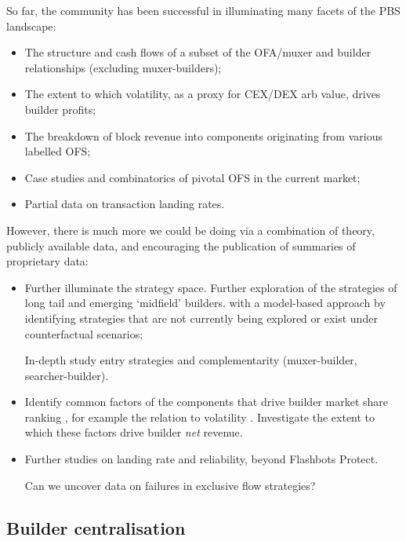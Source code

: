 So far, the community has been successful in illuminating many facets of the PBS landscape:
%
\begin{itemize}
  \item The structure and cash flows of a subset of the OFA/muxer and builder relationships (excluding muxer-builders);
  \item The extent to which volatility, as a proxy for CEX/DEX arb value, drives builder profits;
  \item The breakdown of block revenue into components originating from various labelled OFS;
  \item Case studies and combinatorics of pivotal OFS in the current market;
  \item Partial data on transaction landing rates.
\end{itemize}
%
However, there is much more we could be doing via a combination of theory, publicly available data, and encouraging the publication of summaries of proprietary data:
%
\begin{itemize}
    \item 
      Further illuminate the strategy space.
      Further exploration of the strategies of long tail and emerging `midfield' builders.
       with a model-based approach by identifying strategies that are not currently being explored or exist under counterfactual scenarios;

      In-depth study entry strategies and complementarity (muxer-builder, searcher-builder). 
    \item 
      Identify common factors of the components that drive builder market share ranking \cite{oz2024whoa}, for example the relation to volatility \cite{gupta2023centralizing}.
      Investigate the extent to which these factors drive builder \emph{net} revenue.
    \item 
      Further studies on landing rate and reliability, beyond Flashbots Protect.

      Can we uncover data on failures in exclusive flow strategies?
\end{itemize}

\subsection*{Builder centralisation}

